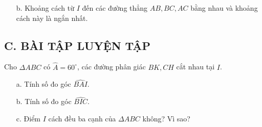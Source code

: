 \begin{vd}
{\begin{enumerate}
\begin{minipage}[H]{0.5 \textwidth}
\end{minipage}
Trường hợp 4: Tương tự, chúng ta nhận được điểm $I_3$ là giao điểm của hai đường phân giác của hai góc ngoài tại $A$ và $B$. \\
Vậy ta tìm được $4$ điểm $I,I_1,I_2,I_3$ cách đều các đường thẳng $AB,BC,AC$. 
\item[b.] Khoảng cách từ $I$ đến các đường thẳng $AB,BC,AC$ bằng nhau và khoảng cách này là ngắn nhất.
\end{enumerate}
}
\end{vd}

\subsection*{C. BÀI TẬP LUYỆN TẬP}
\setcounter{bt}{0}
\begin{bt}%
Cho $\Delta ABC$ có $\widehat{A} = 60^\circ$, các đường phân giác $BK,CH$ cắt nhau tại $I$. 
\begin{enumerate}
\item[a.] Tính số đo góc $\widehat{BAI}$. 
\item[b.] Tính số đo góc $\widehat{BIC}$.
\item[c.] Điểm $I$ cách đều ba cạnh của $\Delta ABC$ không? Vì sao?
\end{enumerate}
\end{bt}

